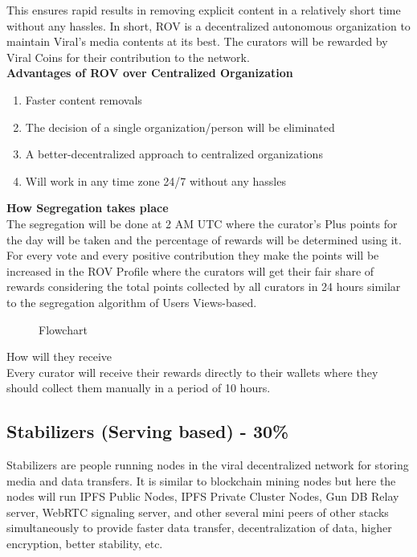 \documentclass[10pt]{article}
\begin{document}
This ensures rapid results in removing explicit content in a relatively short time without any hassles. In short, ROV is a decentralized autonomous organization to maintain Viral's media contents at its best. The curators will be rewarded by Viral Coins for their contribution to the network.\\

\textbf{Advantages of ROV over Centralized Organization}\\
\begin{enumerate}[leftmargin=+0.2in]
\item Faster content removals
\item The decision of a single organization/person will be eliminated
\item A better-decentralized approach to centralized organizations
\item Will work in any time zone 24/7 without any hassles
\end{enumerate}


\textbf{How Segregation takes place}\\

The segregation will be done at 2 AM UTC where the curator's Plus points for the day will be taken and the percentage of rewards will be determined using it. For every vote and every positive contribution they make the points will be increased in the ROV Profile where the curators will get their fair share of rewards considering the total points collected by all curators in 24 hours similar to the segregation algorithm of Users Views-based.\\

\begin{figure}
\begin{center}
\caption{Flowchart}
\end{center}
\end{figure}

How will they receive\\

Every curator will receive their rewards directly to their wallets where they should collect them manually in a period of 10 hours.\\

\subsection{Stabilizers (Serving based) - 30\%}

Stabilizers are people running nodes in the viral decentralized network for storing media and data transfers. It is similar to blockchain mining nodes but here the nodes will run IPFS Public Nodes, IPFS Private Cluster Nodes, Gun DB Relay server, WebRTC signaling server, and other several mini peers of other stacks simultaneously to provide faster data transfer, decentralization of data, higher encryption, better stability, etc. \\
\end{document}
